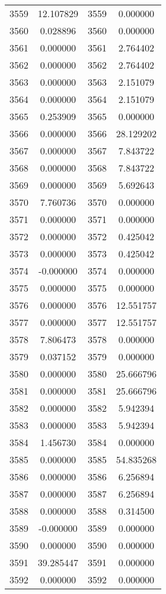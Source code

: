 \documentclass[12pt]{article}
\begin{document}
\begin{longtable}{@{}cccc@{}}
3559 & 12.107829 & 3559 & 0.000000 \\
3560 & 0.028896 & 3560 & 0.000000 \\
3561 & 0.000000 & 3561 & 2.764402 \\
3562 & 0.000000 & 3562 & 2.764402 \\
3563 & 0.000000 & 3563 & 2.151079 \\
3564 & 0.000000 & 3564 & 2.151079 \\
3565 & 0.253909 & 3565 & 0.000000 \\
3566 & 0.000000 & 3566 & 28.129202 \\
3567 & 0.000000 & 3567 & 7.843722 \\
3568 & 0.000000 & 3568 & 7.843722 \\
3569 & 0.000000 & 3569 & 5.692643 \\
3570 & 7.760736 & 3570 & 0.000000 \\
3571 & 0.000000 & 3571 & 0.000000 \\
3572 & 0.000000 & 3572 & 0.425042 \\
3573 & 0.000000 & 3573 & 0.425042 \\
3574 & -0.000000 & 3574 & 0.000000 \\
3575 & 0.000000 & 3575 & 0.000000 \\
3576 & 0.000000 & 3576 & 12.551757 \\
3577 & 0.000000 & 3577 & 12.551757 \\
3578 & 7.806473 & 3578 & 0.000000 \\
3579 & 0.037152 & 3579 & 0.000000 \\
3580 & 0.000000 & 3580 & 25.666796 \\
3581 & 0.000000 & 3581 & 25.666796 \\
3582 & 0.000000 & 3582 & 5.942394 \\
3583 & 0.000000 & 3583 & 5.942394 \\
3584 & 1.456730 & 3584 & 0.000000 \\
3585 & 0.000000 & 3585 & 54.835268 \\
3586 & 0.000000 & 3586 & 6.256894 \\
3587 & 0.000000 & 3587 & 6.256894 \\
3588 & 0.000000 & 3588 & 0.314500 \\
3589 & -0.000000 & 3589 & 0.000000 \\
3590 & 0.000000 & 3590 & 0.000000 \\
3591 & 39.285447 & 3591 & 0.000000 \\
3592 & 0.000000 & 3592 & 0.000000 \\

\end{longtable}
\end{document}
